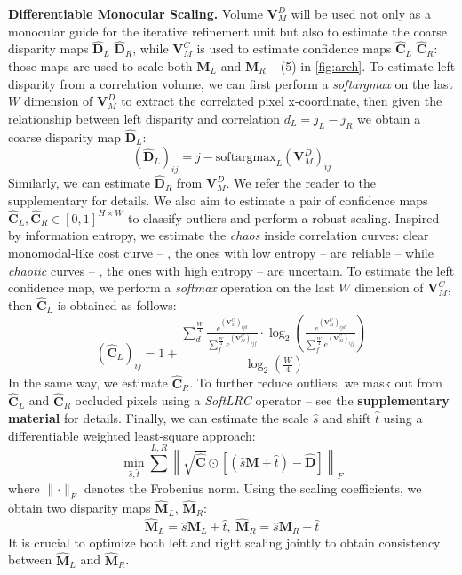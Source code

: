 \documentclass[10pt,twocolumn,letterpaper]{article}
\begin{document}
\textbf{Differentiable Monocular Scaling.} Volume $\mathbf{V}^D_M$ will be used not only as a monocular guide for the iterative refinement unit but also to estimate the coarse disparity maps $\hat{\mathbf{D}}_L$ $\hat{\mathbf{D}}_R$, while $\mathbf{V}^C_M$ is used to estimate confidence maps $\hat{\mathbf{C}}_L$ $\hat{\mathbf{C}}_R$: those maps are used to scale both $\mathbf{M}_L$ and $\mathbf{M}_R$ -- (5) in \cref{fig:arch}.
To estimate left disparity from a correlation volume, we can first perform a \textit{softargmax} on the last $W$ dimension of $\mathbf{V}^D_M$ to extract the correlated pixel x-coordinate, then given the relationship between left disparity and correlation $d_L=j_L-j_R$ we obtain a coarse disparity map $\hat{\mathbf{D}}_L$:
\begin{equation}
    (\hat{\mathbf{D}}_L)_{ij} = j - \text{softargmax}_L(\mathbf{V}^D_M)_{ij}
    \label{eq:softmax_left}
\end{equation}
Similarly, we can estimate $\hat{\mathbf{D}}_R$ from $\mathbf{V}^D_M$. We refer the reader to the supplementary for details.
We also aim to estimate a pair of confidence maps $\hat{\mathbf{C}}_L, \hat{\mathbf{C}}_R \in [0,1]^{H \times W}$ to classify outliers and perform a robust scaling.
Inspired by information entropy, we estimate the \textit{chaos} inside correlation curves: clear monomodal-like cost curve -- \ie, the ones with low entropy -- are reliable -- while \textit{chaotic} curves -- \ie, the ones with high entropy -- are uncertain.
To estimate the left confidence map, we perform a \textit{softmax} operation on the last $W$ dimension of $\mathbf{V}^C_M$, then $\hat{\mathbf{C}}_L$ is obtained as follows:
\begin{equation}
    (\hat{\mathbf{C}}_L)_{ij} = 1  + \frac{\sum_{d}^{\frac{W}{4}} \frac{e^{(\mathbf{V}^C_M)_{ijd}}}{\sum_{f}^{\frac{W}{4}} e^{(\mathbf{V}^C_M)_{ijf}}} \cdot \log_2 \left( \frac{e^{(\mathbf{V}^C_M)_{ijd}}}{\sum_{f}^{\frac{W}{4}} e^{(\mathbf{V}^C_M)_{ijf}}} \right)}{\log_2(\frac{W}{4})}
    \label{eq:confidence_left}
\end{equation}
In the same way, we estimate $\hat{\mathbf{C}}_R$.
To further reduce outliers, we mask out from $\hat{\mathbf{C}}_L$ and $\hat{\mathbf{C}}_R$ occluded pixels using a \textit{SoftLRC} operator -- see the \textbf{supplementary material} for details.
Finally, we can estimate the scale $\hat{s}$ and shift $\hat{t}$ using a differentiable weighted least-square approach:
\begin{equation}
    \min_{\hat{s}, \hat{t}} \sum_{}^{L,R} \left\lVert \sqrt{\hat{\mathbf{C}}}\odot\left[\left(\hat{s}\mathbf{M} + \hat{t}\right)  - \hat{\mathbf{D}} \right] \right\rVert_F
    \label{eq:scale_shift}
\end{equation}
where $\lVert\cdot\rVert_F$ denotes the Frobenius norm.
Using the scaling coefficients, we obtain two disparity maps $\hat{\mathbf{M}}_L$, $\hat{\mathbf{M}}_R$:
\begin{equation}
    \hat{\mathbf{M}}_L = \hat{s}\mathbf{M}_L + \hat{t},\ \hat{\mathbf{M}}_R = \hat{s}\mathbf{M}_R + \hat{t}
    \label{eq:scaling_op}
\end{equation}
It is crucial to optimize both left and right scaling jointly to obtain consistency between $\hat{\mathbf{M}}_L$ and $\hat{\mathbf{M}}_R$.
\end{document}
